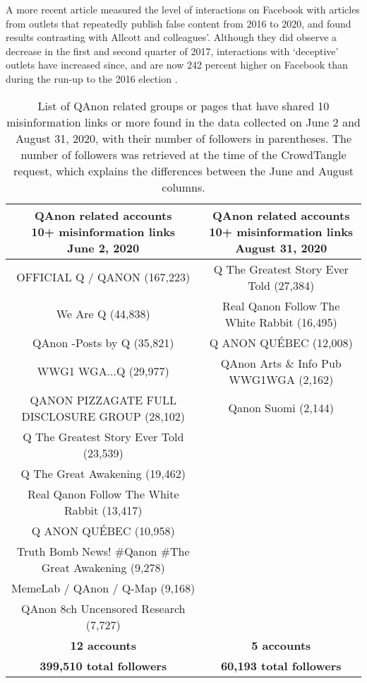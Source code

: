 \documentclass[sigconf]{acmart}
\begin{document}
A more recent article measured the level of interactions on Facebook with articles from outlets that repeatedly publish false content from 2016 to 2020, and found results contrasting with Allcott and colleagues'. Although they did observe a decrease in the first and second quarter of 2017,  interactions with `deceptive' outlets have increased since, and are now 242 percent higher on Facebook than during the run-up to the 2016 election \cite{KornbluhPandemic}.

\begin{table*}[t]
  \caption{List of QAnon related groups or pages that have shared 10 misinformation links or more found in the data collected on June 2 and August 31, 2020, with their number of followers in parentheses. The number of followers was retrieved at the time of the CrowdTangle request, which explains the differences between the June and August columns.}
  \label{table_1}
  \begin{tabular}{cc}
    \toprule
    \shortstack{QAnon related accounts\\ 10+ misinformation links \\ June 2, 2020} & \shortstack{QAnon related accounts\\ 10+ misinformation links \\ August 31, 2020} \\
    \midrule
    OFFICIAL Q / QANON (167,223) & Q The Greatest Story Ever Told (27,384)\\
    We Are Q (44,838) & Real Qanon Follow The White Rabbit (16,495)\\
    QAnon -Posts by Q (35,821) & Q ANON QU\'EBEC (12,008)\\
    WWG1 WGA...Q (29,977) & QAnon Arts \& Info Pub \space\space\space\space\space\space\space WWG1WGA (2,162)\\
    QANON PIZZAGATE FULL DISCLOSURE GROUP (28,102) & Qanon Suomi (2,144)\\
    Q The Greatest Story Ever Told (23,539)&\\
    Q The Great Awakening (19,462)&\\
    Real Qanon Follow The White Rabbit (13,417)&\\
    Q ANON QU\'EBEC (10,958)&\\
    Truth Bomb News! \#Qanon \#The Great Awakening (9,278)&\\
    MemeLab / QAnon / Q-Map (9,168)&\\
    QAnon 8ch Uncensored Research (7,727)&\\
    \midrule
    \textbf{12 accounts} & \textbf{5 accounts}\\
    \textbf{399,510 total followers} & \textbf{60,193 total followers}\\
  \bottomrule
\end{tabular}
\end{table*}
\end{document}
